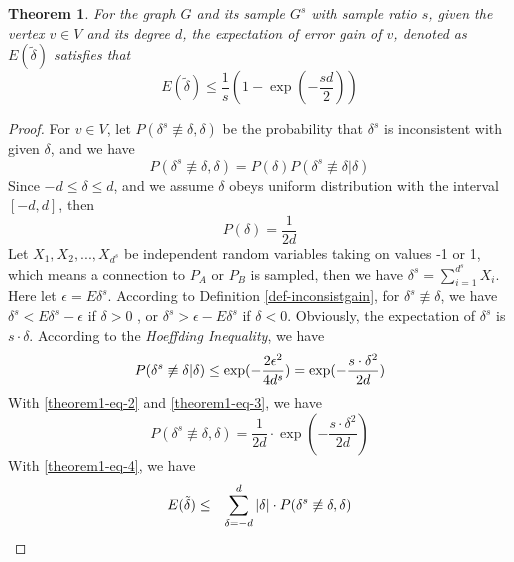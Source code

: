 \documentclass{sig-alternate-2013}
\begin{document}
\newtheorem{theorem}{Theorem}
\begin{theorem}\label{theorem-partition-error-a-vertex}
For the graph $G$ and its sample $G^s$ with sample ratio $s$, given the vertex $v \in V$ and its degree $d$, the expectation of error gain of $v$, denoted as $E(\tilde\delta)$ satisfies that
\begin{equation}\label{theorem1-eq-0}
E(\tilde\delta) \leq \frac{1}{s} (1-\exp(-\frac{s d}{2}))
\end{equation}
\end{theorem}
\begin{proof}
For $v \in V$, let $P(\delta^s \not\equiv \delta, \delta)$ be the probability that $\delta^s$ is inconsistent with given $\delta$, and we have
\begin{equation}\label{theorem1-eq-1}
P( \delta^s \not\equiv \delta, \delta) = P(\delta)P(\delta^s \not\equiv \delta |\delta)
\end{equation}
Since $-d\leq\delta\leq d$, and we assume $\delta$ obeys uniform distribution with the interval $[-d, d]$, then
\begin{equation}\label{theorem1-eq-2}
P(\delta)=\frac{1}{2d}
\end{equation}
Let $X_1, X_2,...,X_{d^s}$ be independent random variables taking on values -1 or 1, which means a connection to $P_A$ or $P_B$ is sampled, then we have $\delta^s = \sum_{i=1}^{d^s} X_i$. Here let $\epsilon = E\delta^s$.
According to Definition \ref{def-inconsistgain}, for $ \delta^s \not\equiv \delta$, we have $\delta^s < E\delta^s - \epsilon$ if $\delta > 0 $ , or $\delta^s > \epsilon - E\delta^s$ if $\delta < 0$.
Obviously, the expectation of $\delta^s$ is $s\cdot \delta$. According to the \textit{Hoeffding Inequality}, we have
\begin{equation}\label{theorem1-eq-3}
P(\delta^s \not\equiv \delta | \delta)  \leq  \exp(-\frac{2\epsilon^2}{4d^s}) \\
 = \exp(-\frac{s\cdot \delta^2}{2d})
\end{equation}
With \eqref{theorem1-eq-2} and \eqref{theorem1-eq-3}, we have
\begin{equation}\label{theorem1-eq-4}
P( \delta^s \not\equiv \delta, \delta) = \frac{1}{2d} \cdot \exp(-\frac{s\cdot \delta^2}{2d})
\end{equation}
With \eqref{theorem1-eq-4}, we have
\begin{eqnarray}\label{theorem1-eq-5}
E(\tilde\delta) &\leq& \sum_{\delta=-d}^{d} {|\delta| \cdot P( \delta^s \not\equiv \delta, \delta) } \notag \\

\end{eqnarray}
\end{proof}
\end{document}
